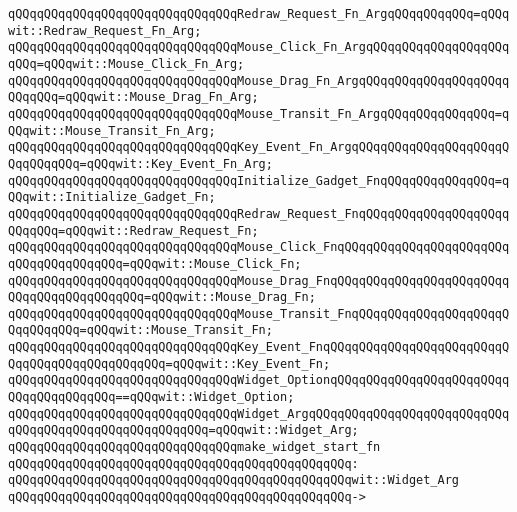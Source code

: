 \verb|qQQqqQQqqQQqqQQqqQQqqQQqqQQqqQQqRedraw_Request_Fn_ArgqQQqqQQqqQQq=qQQqwit::Redraw_Request_Fn_Arg;|\newline
\verb|qQQqqQQqqQQqqQQqqQQqqQQqqQQqqQQqMouse_Click_Fn_ArgqQQqqQQqqQQqqQQqqQQqqQQq=qQQqwit::Mouse_Click_Fn_Arg;|\newline
\verb|qQQqqQQqqQQqqQQqqQQqqQQqqQQqqQQqMouse_Drag_Fn_ArgqQQqqQQqqQQqqQQqqQQqqQQqqQQq=qQQqwit::Mouse_Drag_Fn_Arg;|\newline
\verb|qQQqqQQqqQQqqQQqqQQqqQQqqQQqqQQqMouse_Transit_Fn_ArgqQQqqQQqqQQqqQQq=qQQqwit::Mouse_Transit_Fn_Arg;|\newline
\verb|qQQqqQQqqQQqqQQqqQQqqQQqqQQqqQQqKey_Event_Fn_ArgqQQqqQQqqQQqqQQqqQQqqQQqqQQqqQQq=qQQqwit::Key_Event_Fn_Arg;|\newline
\newline
\verb|qQQqqQQqqQQqqQQqqQQqqQQqqQQqqQQqInitialize_Gadget_FnqQQqqQQqqQQqqQQq=qQQqwit::Initialize_Gadget_Fn;|\newline
\verb|qQQqqQQqqQQqqQQqqQQqqQQqqQQqqQQqRedraw_Request_FnqQQqqQQqqQQqqQQqqQQqqQQqqQQq=qQQqwit::Redraw_Request_Fn;|\newline
\verb|qQQqqQQqqQQqqQQqqQQqqQQqqQQqqQQqMouse_Click_FnqQQqqQQqqQQqqQQqqQQqqQQqqQQqqQQqqQQqqQQq=qQQqwit::Mouse_Click_Fn;|\newline
\verb|qQQqqQQqqQQqqQQqqQQqqQQqqQQqqQQqMouse_Drag_FnqQQqqQQqqQQqqQQqqQQqqQQqqQQqqQQqqQQqqQQqqQQq=qQQqwit::Mouse_Drag_Fn;|\newline
\verb|qQQqqQQqqQQqqQQqqQQqqQQqqQQqqQQqMouse_Transit_FnqQQqqQQqqQQqqQQqqQQqqQQqqQQqqQQq=qQQqwit::Mouse_Transit_Fn;|\newline
\verb|qQQqqQQqqQQqqQQqqQQqqQQqqQQqqQQqKey_Event_FnqQQqqQQqqQQqqQQqqQQqqQQqqQQqqQQqqQQqqQQqqQQqqQQq=qQQqwit::Key_Event_Fn;|\newline
\verb|qQQqqQQqqQQqqQQqqQQqqQQqqQQqqQQqWidget_OptionqQQqqQQqqQQqqQQqqQQqqQQqqQQqqQQqqQQqqQQq==qQQqwit::Widget_Option;|\newline
\verb|qQQqqQQqqQQqqQQqqQQqqQQqqQQqqQQqWidget_ArgqQQqqQQqqQQqqQQqqQQqqQQqqQQqqQQqqQQqqQQqqQQqqQQqqQQqqQQq=qQQqwit::Widget_Arg;|\newline
\newline
\verb|qQQqqQQqqQQqqQQqqQQqqQQqqQQqqQQqmake_widget_start_fn|\newline
\verb|qQQqqQQqqQQqqQQqqQQqqQQqqQQqqQQqqQQqqQQqqQQqqQQq:|\newline
\verb|qQQqqQQqqQQqqQQqqQQqqQQqqQQqqQQqqQQqqQQqqQQqqQQqwit::Widget_Arg|\newline
\verb|qQQqqQQqqQQqqQQqqQQqqQQqqQQqqQQqqQQqqQQqqQQqqQQq->|\newline
